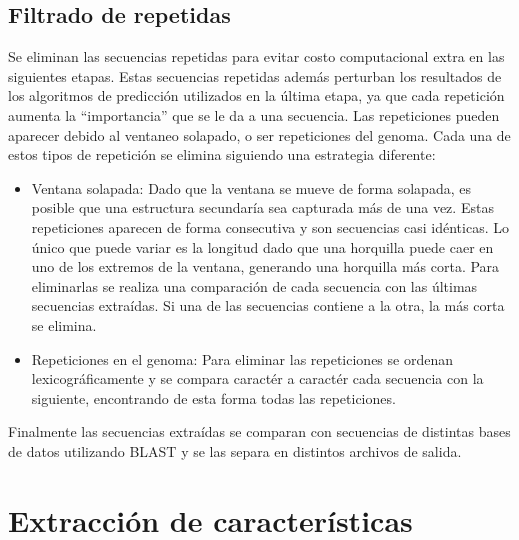 \subsection{Filtrado de repetidas}

Se eliminan las secuencias repetidas para evitar costo computacional extra en las siguientes etapas. Estas secuencias repetidas además perturban los
resultados de los algoritmos de predicción utilizados en la última etapa, ya que cada repetición aumenta la “importancia” que se le da a una secuencia.
Las repeticiones pueden aparecer debido al ventaneo solapado, o ser repeticiones del genoma. Cada una de estos tipos de repetición se elimina siguiendo una
estrategia diferente:

\begin{itemize}
	\item Ventana solapada: Dado que la ventana se mueve de forma solapada, es posible que una estructura secundaría sea capturada más de una vez. Estas
		repeticiones aparecen de forma consecutiva y son secuencias casi idénticas. Lo único que puede variar es la longitud dado que una horquilla
		puede caer en uno
		de los extremos de la ventana, generando una horquilla más corta. Para eliminarlas se realiza una comparación de cada secuencia con las
		últimas secuencias
		extraídas. Si una de las secuencias contiene a la otra, la más corta se elimina.
	\item Repeticiones en el genoma: Para eliminar las repeticiones se ordenan lexicográficamente y se compara caractér a caractér cada secuencia con la
		siguiente, encontrando de esta forma todas las repeticiones.
\end{itemize}

Finalmente las secuencias extraídas se comparan con secuencias de distintas bases de datos utilizando BLAST y se las separa en distintos archivos de salida.

\section{Extracción de características}

